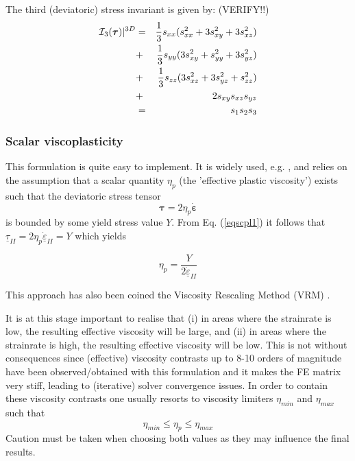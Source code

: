 The third (deviatoric) stress invariant is given by: (VERIFY!!)
\begin{eqnarray}
{\cal I}_3({\bm \tau})|^{3D} 
&=&  \frac{1}{3} s_{xx} (s_{xx}^2 + 3  s_{xy}^2   + 3  s_{xz}^2  )     \nonumber\\
&+& \frac{1}{3} s_{yy} (3s_{xy}^2 +  s_{yy}^2   + 3  s_{yz}^2  )     \nonumber\\
&+& \frac{1}{3} s_{zz} ( 3 s_{xz}^2  + 3 s_{yz}^2 +s_{zz}^2)       \nonumber\\
&+& 2   s_{xy} s_{xz} s_{yz}   \nonumber \\
&=& s_1 s_2 s_3 \nonumber
\end{eqnarray}








\subsubsection{Scalar viscoplasticity}

This formulation is quite easy to implement. It is widely used, e.g. \cite{will92,thfb08,spmw16}, and relies on the assumption that 
a scalar quantity $\eta_p$ (the 'effective plastic viscosity') exists such that the deviatoric stress tensor 
\begin{equation}
{\bm \tau}=2\eta_p \dot{\bm\varepsilon} \label{eqscpl1}
\end{equation}
is bounded by some yield stress value $Y$.
From Eq. (\ref{eqscpl1}) it follows that $\underline{\tau}_{II}= 2\eta_p \dot{\underline{\varepsilon}}_{II}=Y$ which yields
\begin{mdframed}[backgroundcolor=blue!5]
\[
\eta_p = \frac{Y}{2 \dot{\underline{\varepsilon}}_{II}}
\]
\end{mdframed}
This approach has also been coined the Viscosity Rescaling Method (VRM) \cite{kacha04}. 
 


It is at this stage important to realise that (i) in areas where the strainrate is low, the resulting effective viscosity will be large, and 
(ii) in areas where the strainrate is high, the resulting effective viscosity will be low. This is not without consequences since 
(effective) viscosity contrasts up to 8-10 orders of magnitude have been observed/obtained with this formulation and it makes the FE 
matrix very stiff, leading to (iterative) solver convergence issues.
In order to contain these viscosity contrasts one usually resorts to viscosity limiters $\eta_{min}$ and $\eta_{max}$ such that 
\[
\eta_{min} \leq \eta_p \leq \eta_{max}
\]
Caution must be taken when choosing both values as they may influence the final results.



